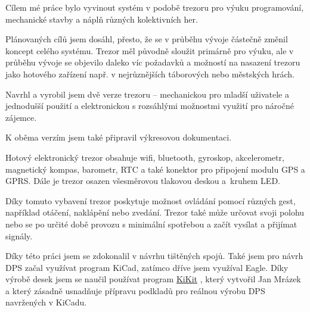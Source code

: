 \vspace{-5mm}

Cílem mé práce bylo vyvinout systém v podobě trezoru pro výuku programování, mechanické stavby a náplň různých kolektivních her. 

Plánovaných cílů jsem dosáhl, přesto, že se v průběhu vývoje částečně změnil koncept celého systému. Trezor měl původně sloužit primárně pro výuku, ale v průběhu vývoje 
se objevilo daleko víc požadavků a možností na nasazení trezoru jako hotového zařízení např. v nejrůznějších táborových nebo městských hrách. 

Navrhl a vyrobil jsem dvě verze trezoru -- mechanickou pro mladší uživatele
a jednodušší použití a elektronickou s rozsáhlými možnostmi využití pro 
náročné zájemce. 

K oběma verzím jsem také připravil výkresovou dokumentaci. 

Hotový elektronický trezor obsahuje wifi, bluetooth, gyroskop, akcelerometr,
magnetický kompas, barometr, RTC a také konektor pro připojení modulu GPS a GPRS. 
Dále je trezor osazen všesměrovou tlakovou deskou a~kruhem LED.

Díky tomuto vybavení trezor poskytuje možnost 
ovládání pomocí různých gest, například otáčení, naklápění nebo zvedání. 
Trezor také může určovat svoji polohu nebo se po určité době 
provozu s minimální spotřebou  a začít vysílat a přijímat signály.

Díky této práci jsem se zdokonalil v návrhu tištěných spojů. Také jsem pro návrh DPS začal využívat program KiCad, zatímco dříve jsem využíval Eagle.
Díky výrobě desek jsem se naučil používat program \href{https://github.com/yaqwsx/KiKit}{KiKit} \parencite{KiKit}, 
který vytvořil Jan Mrázek a který zásadně usnadňuje přípravu podkladů pro reálnou výrobu DPS navržených v KiCadu.

